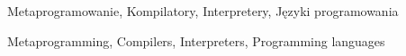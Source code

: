 \documentclass[
    left=2.5cm,         %
    right=2.5cm,        %
    top=2.5cm,          %
    bottom=3cm,         %
    bindingoffset=6mm,  %
    nohyphenation=false %
]{eiti/eiti-thesis}
\begin{document}
\slowakluczowe Metaprogramowanie, Kompilatory, Interpretery, Języki programowania

\newpage
\abstract \kant[1-3]
\keywords Metaprogramming, Compilers, Interpreters, Programming languages

\cleardoublepage  %
\pagestyle{plain}
\makeauthorship

\cleardoublepage %
\tableofcontents

\cleardoublepage %
\pagestyle{headings}


\newpage

\newpage

\newpage

\newpage

\newpage

\newpage

\newpage

\newpage



\cleardoublepage %
\printbibliography

\newpage
\pagestyle{plain}

\vspace{0.8cm}

\listoffigurestoc     %
\vspace{1cm}          %


\end{document}
